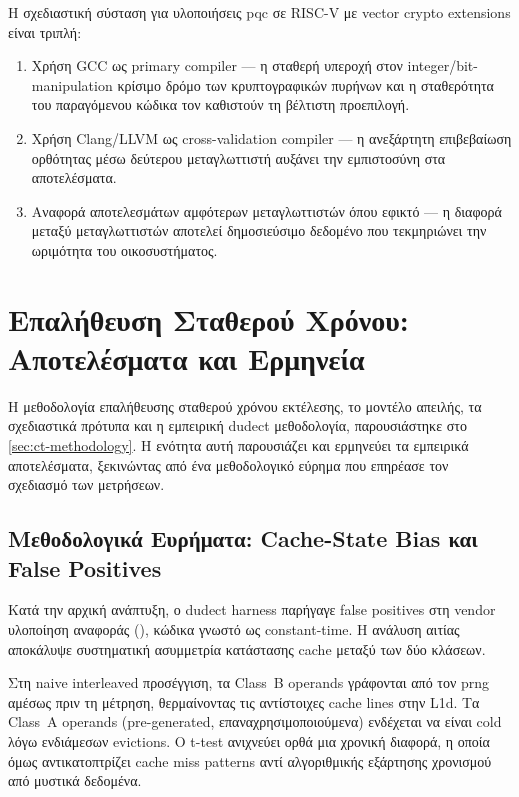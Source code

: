 Η σχεδιαστική σύσταση για υλοποιήσεις \gls{pqc} σε RISC-V με vector
crypto extensions είναι τριπλή:

\begin{enumerate}
  \item Χρήση GCC ως primary compiler — η σταθερή υπεροχή στον
    integer/bit-manipulation κρίσιμο δρόμο των κρυπτογραφικών πυρήνων
    και η σταθερότητα του παραγόμενου κώδικα τον καθιστούν τη βέλτιστη
    προεπιλογή.
  \item Χρήση Clang/LLVM ως cross-validation compiler — η ανεξάρτητη
    επιβεβαίωση ορθότητας μέσω δεύτερου μεταγλωττιστή αυξάνει την
    εμπιστοσύνη στα αποτελέσματα.
  \item Αναφορά αποτελεσμάτων αμφότερων μεταγλωττιστών όπου εφικτό —
    η διαφορά μεταξύ μεταγλωττιστών αποτελεί δημοσιεύσιμο δεδομένο
    που τεκμηριώνει την ωριμότητα του οικοσυστήματος.
\end{enumerate}

\ifTODO
\section{Επαλήθευση Σταθερού Χρόνου: Αποτελέσματα και Ερμηνεία}
\label{sec:ct-verification}

Η μεθοδολογία επαλήθευσης σταθερού χρόνου εκτέλεσης, το μοντέλο απειλής, τα
σχεδιαστικά πρότυπα και η εμπειρική dudect μεθοδολογία, παρουσιάστηκε στο
\cref{sec:ct-methodology}. Η ενότητα αυτή παρουσιάζει και ερμηνεύει τα
εμπειρικά αποτελέσματα, ξεκινώντας από ένα μεθοδολογικό εύρημα που επηρέασε
τον σχεδιασμό των μετρήσεων.

\subsection{Μεθοδολογικά Ευρήματα: Cache-State Bias και False Positives}
\label{ssec:ct-cache-bias}

Κατά την αρχική ανάπτυξη, ο dudect harness παρήγαγε false positives στη
vendor υλοποίηση αναφοράς (), κώδικα γνωστό ως
constant-time. Η ανάλυση αιτίας αποκάλυψε συστηματική ασυμμετρία
κατάστασης cache μεταξύ των δύο κλάσεων.

Στη naive interleaved προσέγγιση, τα Class~B operands γράφονται από τον
\gls{prng} αμέσως πριν τη μέτρηση, θερμαίνοντας τις αντίστοιχες cache
lines στην L1d. Τα Class~A operands (pre-generated, επαναχρησιμοποιούμενα)
ενδέχεται να είναι cold λόγω ενδιάμεσων evictions. Ο t-test ανιχνεύει
ορθά μια χρονική διαφορά, η οποία όμως αντικατοπτρίζει cache miss patterns
αντί αλγοριθμικής εξάρτησης χρονισμού από μυστικά δεδομένα.

